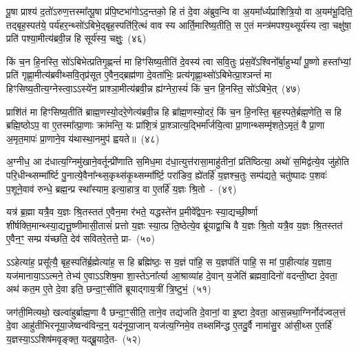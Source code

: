 पू॒षा प्राश्य॑ द॒तो॑\-ऽरुण॒त्तस्मा᳚त्पू॒षा प्र॑पि॒ष्टभा॑गो\-ऽद॒न्तको॒ हि तं दे॒वा अ॑ब्रुव॒न्वि वा अ॒यमा᳚र्ध्यप्राशित्रि॒यो वा अ॒यम॑भू॒दिति॒ तद्बृह॒स्पत॑ये॒ पर्य॑हर॒न्थ्सो॑\-ऽबिभे॒द्बृह॒स्पति॑रि॒त्थं वाव स्य आर्ति॒\-मारि॑\-ष्य॒\-तीति॒ स ए॒तं मन्त्र॑मपश्य॒थ्सूर्य॑स्य त्वा॒ चक्षु॑षा॒ प्रति॑ पश्या॒मीत्य॑ब्रवी॒न्न हि सूर्य॑स्य॒ चक्षुः॒~(४६)

किं च॒न हि॒नस्ति॒ सो॑\-ऽबिभेत्प्रतिगृ॒ह्णन्तं॑ मा हिꣳसिष्य॒तीति॑ दे॒वस्य॑ त्वा सवि॒तुः प्र॑स॒वे᳚\-ऽश्विनो᳚र्बा॒हु\-भ्यां᳚ पू॒ष्णो हस्ता᳚भ्यां॒ प्रति॑ गृह्णा॒मीत्य॑ब्रवीथ्सवि॒तृप्र॑सूत ए॒वैन॒द्ब्रह्म॑णा दे॒वता॑भिः॒ प्रत्य॑\-गृह्णा॒थ्सो॑\-ऽबिभेत्प्रा॒श्ञन्तं॑ मा हिꣳसिष्य॒तीत्य॒ग्नेस्त्वा॒\-ऽऽ\-\-स्ये॑न॒ प्राश्ञा॒मीत्य॑ब्रवी॒न्न ह्य॑ग्नेरा॒स्यं॑ किं च॒न हि॒नस्ति॒ सो॑\-ऽबिभे॒त्~(४७)

प्राशि॑तं मा हिꣳसिष्य॒तीति॑ ब्राह्म॒णस्यो॒दरे॒णेत्य॑ब्रवी॒न्न हि ब्रा᳚ह्म॒णस्यो॒दरं॒ किं च॒न हि॒नस्ति॒ बृह॒स्पते॒र्ब्रह्म॒णेति॒ स हि ब्रह्मि॒ष्ठो\-ऽप॒ वा ए॒तस्मा᳚त्प्रा॒णाः क्रा॑मन्ति॒ यः प्रा॑शि॒त्रं प्रा॒श्ञात्य॒द्भिर्मा᳚र्जयि॒त्वा प्रा॒णान्थ्सम्मृ॑शते॒\-ऽमृतं॒ वै प्रा॒णा अ॒मृत॒मापः॑ प्रा॒णाने॒व य॑थास्था॒नमुप॑ ह्वयते॥~(४८)

{\anuvakamend[{प्रा॒श्ञी॒याद्धोता॑ य॒ज्ञं निर॑हर॒न्तच्चक्षु॑रा॒स्य॑ङ्किं च॒न हि॒नस्ति॒ सो॑\-ऽबिभे॒च्चतु॑श्चत्वारिꣳशच्च}]}%

अ॒ग्नीध॒ आ द॑धात्य॒ग्निमु॑खाने॒वर्तून्प्री॑णाति स॒मिध॒मा द॑धा॒त्युत्त॑रासा॒माहु॑तीनां॒ प्रति॑ष्ठित्या॒ अथो॑ स॒मिद्व॑त्ये॒व जु॑होति परि॒धीन्थ्सम्मा᳚र्ष्टि पु॒नात्ये॒वैना᳚न्थ्स॒कृथ्स॑कृ॒थ्सम्मा᳚र्ष्टि॒ परा॑ङिव॒ ह्ये॑तर्\mbox{}हि॑ य॒ज्ञश्च॒तुः सम्प॑द्यते॒ चतु॑ष्पादः प॒शवः॑ प॒शूने॒वाव॑ रुन्धे॒ ब्रह्म॒न्प्र स्था᳚स्याम॒ इत्या॒हात्र॒ वा ए॒तर्\mbox{}हि॑ य॒ज्ञः श्रि॒तो~-~(४९)

यत्र॑ ब्र॒ह्मा यत्रै॒व य॒ज्ञः श्रि॒तस्तत॑ ए॒वैन॒मा र॑भते॒ यद्धस्ते॑न प्र॒मीवे᳚द्वेप॒नः स्या॒द्यच्छी॒र्ष्णा शी॑र्\mbox{}षक्ति॒मान्थ्स्या॒द्यत्तू॒ष्णीमासी॒तासं॑ प्रत्तो य॒ज्ञः स्या॒त्प्र ति॒ष्ठेत्ये॒व ब्रू॑याद्वा॒चि वै य॒ज्ञः श्रि॒तो यत्रै॒व य॒ज्ञः श्रि॒तस्तत॑ ए॒वैन॒ꣳ॒ सम्प्र य॑च्छति॒ देव॑ सवितरे॒तत्ते॒ प्रा-~(५०)

ऽ\-ऽहेत्या॑ह॒ प्रसू᳚त्यै॒ बृह॒स्पति॑र्ब्र॒ह्मेत्या॑ह॒ स हि ब्रह्मि॑ष्ठः॒ स य॒ज्ञं पा॑हि॒ स य॒ज्ञप॑तिं पाहि॒ स मां पा॒हीत्या॑ह य॒ज्ञाय॒ यज॑मानाया॒\-ऽऽ\-त्मने॒ तेभ्य॑ ए॒वा\-ऽऽ\-शिष॒मा शा॒स्ते\-ऽना᳚र्त्या आ॒श्राव्या॑ह दे॒वान् य॒जेति॑ ब्रह्मवा॒दिनो॑ वदन्ती॒ष्टा दे॒वता॒ अथ॑ कत॒म ए॒ते दे॒वा इति॒ छन्दा॒ꣳ॒सीति॑ ब्रूयाद्गाय॒त्रीं त्रि॒ष्टुभं॒~(५१)

जग॑ती॒मित्यथो॒ खल्वा॑हुर्ब्राह्म॒णा वै छन्दा॒ꣳ॒सीति॒ ताने॒व तद्य॑जति दे॒वानां॒ वा इ॒ष्टा दे॒वता॒ आस॒न्नथा॒ग्निर्नोद॑ज्वल॒त्तं दे॒वा आहु॑तीभिरनूया॒जेष्वन्व॑विन्द॒न्॒ यद॑नूया॒जान् यज॑त्य॒ग्निमे॒व तथ्समि॑न्द्ध ए॒तदु॒र्वै नामा॑सु॒र आ॑सी॒थ्स ए॒तर्\mbox{}हि॑ य॒ज्ञस्या॒\-ऽऽ\-शिष॑मवृङ्क्त॒ यद्ब्रू॒यादे॒त-~(५२)

